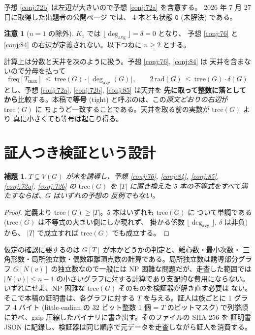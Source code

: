 \documentclass[paper=a4,fontsize=10.5pt,jafontsize=10.5pt]{jlreq}
\theoremstyle{plain}
\newtheorem{lemma}[theorem]{補題}
\theoremstyle{definition}
\newtheorem{remark}[theorem]{注意}
\begin{document}
予想 \ref{conj:72b} は左辺が大きいので予想 \ref{conj:72a} を含意する。
2026 年 7 月 27 日に取得した出題者の公開ページ \cite{wowii} では、
4 本とも状態 \texttt{O} (未解決) である。

\begin{remark}[$n = 1$ の除外]\label{rem:k1}
$K_1$ では $\lfloor \deg_{\mathrm{avg}} \rfloor = \delta = 0$ となり、
予想 \ref{conj:76} と \ref{conj:84} の右辺が定義されない。以下つねに
$n \ge 2$ とする。
\end{remark}

計算上は分数と天井を次のように扱う。予想 \ref{conj:76}, \ref{conj:84} は
天井を含まないので分母を払って
\[ \mathrm{freq}[T_{\max}] \ \le \ \mathrm{tree}(G)
   \cdot \lfloor \deg_{\mathrm{avg}}(G) \rfloor, \qquad
   2\,\mathrm{rad}(G) \ \le \ \mathrm{tree}(G) \cdot \delta(G) \]
とし、予想 \ref{conj:72a}, \ref{conj:72b}, \ref{conj:85} は天井を
\textbf{先に取って整数に落としてから}比較する。本稿で\textbf{等号}
(tight) と呼ぶのは、この\emph{原文どおりの右辺}が $\mathrm{tree}(G)$ に
ちょうど一致することである。天井を取る前の実数が $\mathrm{tree}(G)$ より
真に小さくても等号は起こり得る。

\section{証人つき検証という設計}\label{sec:design}

\begin{lemma}\label{lem:witness}
$T \subseteq V(G)$ が木を誘導し、予想 \ref{conj:76}, \ref{conj:84},
\ref{conj:85}, \ref{conj:72a}, \ref{conj:72b} の $\mathrm{tree}(G)$ を
$|T|$ に置き換えた 5 本の不等式をすべて満たすならば、$G$ はいずれの予想の
反例でもない。
\end{lemma}

\begin{proof}
定義より $\mathrm{tree}(G) \ge |T|$。5 本はいずれも $\mathrm{tree}(G)$ に
ついて単調である ($\mathrm{tree}(G)$ は不等式の大きい側にしか現れず、
掛かる係数 $\lfloor \deg_{\mathrm{avg}} \rfloor$, $\delta$ は非負) から、
$|T|$ で成立すれば $\mathrm{tree}(G)$ でも成立する。
\end{proof}

仮定の確認に要するのは $G[T]$ が木かどうかの判定と、離心数・最小次数・
三角形数・局所独立数・偶数距離頂点数の計算である。局所独立数は誘導部分グラフ
$G[N(v)]$ の独立数なので一般には NP 困難な問題だが、走査した範囲では
$|N(v)| \le n-1$ の小さいグラフに対する計算であり支配的な費用にならない。
いずれにせよ、NP 困難な $\mathrm{tree}(G)$ そのものを検証器が解き直す必要は
ない。そこで本稿の証明書は、各グラフに対する $T$ を与える。証人は族ごとに
1 グラフ 4 バイト (little-endian の 32 ビット整数 1 個 = $T$ のビットマスク)
で列挙順に並べ、gzip 圧縮したバイナリに書き出す。そのファイルの SHA-256 を
証明書 JSON に記録し、検証器は同じ順序で元データを走査しながら証人を消費する。
\end{document}
